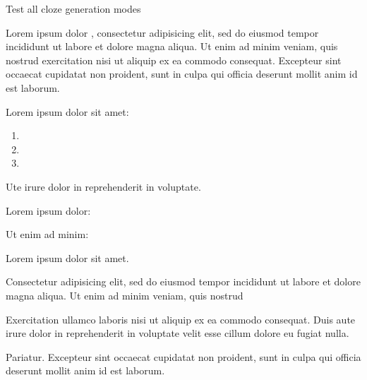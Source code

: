 \documentclass{article}
\begin{document}
{Test all cloze generation modes}


Lorem ipsum dolor , consectetur adipisicing elit, sed do
eiusmod tempor incididunt ut labore et dolore magna aliqua. Ut enim ad
minim veniam, quis nostrud exercitation  nisi ut
aliquip ex ea commodo consequat.  Excepteur sint occaecat cupidatat non proident, sunt in culpa
qui officia deserunt mollit anim id est laborum.


Lorem ipsum dolor sit amet:

\begin{enumerate}
\item {}
\item {}
\item {}
\end{enumerate}

Ute irure dolor in reprehenderit in voluptate.


Lorem ipsum dolor: 

Ut enim ad minim: 


\begin{clozepar}
Lorem ipsum dolor sit amet.
\end{clozepar}

Consectetur adipisicing elit, sed do eiusmod tempor incididunt ut labore
et dolore magna aliqua. Ut enim ad minim veniam, quis nostrud

\begin{clozepar}
Exercitation ullamco laboris nisi ut aliquip ex ea commodo consequat.
Duis aute irure dolor in reprehenderit in voluptate velit esse cillum
dolore eu fugiat nulla.
\end{clozepar}

Pariatur. Excepteur sint
occaecat cupidatat non proident, sunt in culpa qui officia deserunt
mollit anim id est laborum.
\end{document}
